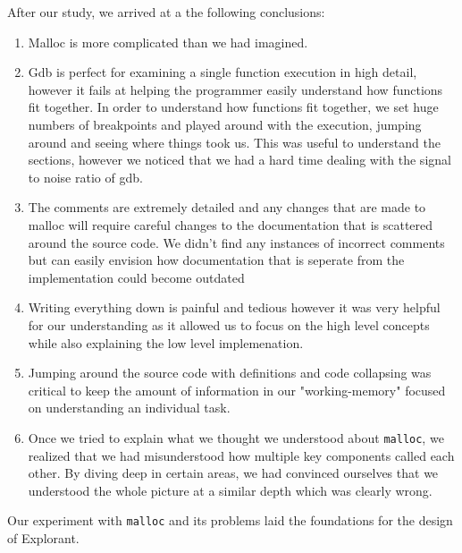 \noindent After our study, we arrived at a the following conclusions:
\begin{enumerate}
    \item Malloc is more complicated than we had imagined.
    \item Gdb is perfect for examining a single function execution in high detail, however it fails at helping the programmer easily understand how functions fit together. In order to understand how functions fit together, we set huge numbers of breakpoints and played around with the execution, jumping around and seeing where things took us. This was useful to understand the sections, however we noticed that we had a hard time dealing with the signal to noise ratio of gdb. 
    \item The comments are extremely detailed and any changes that are made to malloc will require careful changes to the documentation that is scattered around the source code. We didn't find any instances of incorrect comments but can easily envision how documentation that is seperate from the implementation could become outdated
    \item Writing everything down is painful and tedious however it was very helpful for our understanding as it allowed us to focus on the high level concepts while also explaining the low level implemenation.
    \item Jumping around the source code with definitions and code collapsing was critical to keep the amount of information in our "working-memory" focused on understanding an individual task.
    \item Once we tried to explain what we thought we understood about \texttt{malloc}, we realized that we had misunderstood how multiple key components called each other. By diving deep in certain areas, we had convinced ourselves that we understood the whole picture at a similar depth which was clearly wrong.
\end{enumerate}

Our experiment with \texttt{malloc} and its problems laid the foundations for the design of Explorant. 
